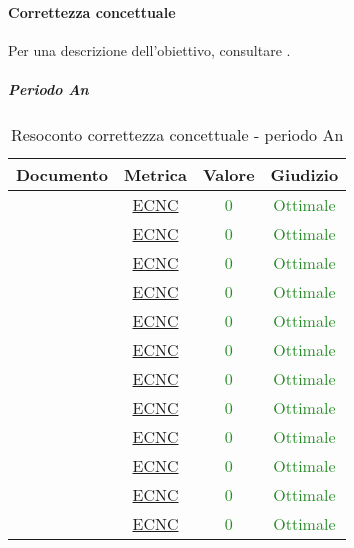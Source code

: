 				\paragraph{Correttezza concettuale}
					Per una descrizione dell'obiettivo, consultare .
					\subparagraph{Periodo An}
				
						\begin{table}[H]
							\centering
							\small
							\begin{tabular}{c | c | c | c}
								\hline
								\textbf{Documento} & \textbf{Metrica} & \textbf{Valore} & \textbf{Giudizio} \\
								\hline
								\pdpvuno & \hyperref[MCC]{ECNC} & \textcolor{ForestGreen}{0} & \textcolor{ForestGreen}{Ottimale} \\
								\pdqvuno & \hyperref[MCC]{ECNC} & \textcolor{ForestGreen}{0} & \textcolor{ForestGreen}{Ottimale}\\
								\ndpvuno & \hyperref[MCC]{ECNC} &\textcolor{ForestGreen}{0} & \textcolor{ForestGreen}{Ottimale}\\
								\sdfv & \hyperref[MCC]{ECNC} & \textcolor{ForestGreen}{0} & \textcolor{ForestGreen}{Ottimale}\\
								\adrvuno & \hyperref[MCC]{ECNC} & \textcolor{ForestGreen}{0} & \textcolor{ForestGreen}{Ottimale}\\
								\glvuno  & \hyperref[MCC]{ECNC} & \textcolor{ForestGreen}{0} & \textcolor{ForestGreen}{Ottimale}\\
								\vunoi& \hyperref[MCC]{ECNC} & \textcolor{ForestGreen}{0} & \textcolor{ForestGreen}{Ottimale}\\
								\vduei& \hyperref[MCC]{ECNC} & \textcolor{ForestGreen}{0} & \textcolor{ForestGreen}{Ottimale}\\
								\vtrei & \hyperref[MCC]{ECNC} & \textcolor{ForestGreen}{0} & \textcolor{ForestGreen}{Ottimale}\\
								\vquattroi & \hyperref[MCC]{ECNC} & \textcolor{ForestGreen}{0} & \textcolor{ForestGreen}{Ottimale}\\
								\vunoe & \hyperref[MCC]{ECNC} & \textcolor{ForestGreen}{0} & \textcolor{ForestGreen}{Ottimale}\\
								\vduee & \hyperref[MCC]{ECNC} & \textcolor{ForestGreen}{0} & \textcolor{ForestGreen}{Ottimale}\\
								\hline
							\end{tabular}
							\caption{Resoconto correttezza concettuale - periodo An}
							\label{tab_resoconto_correttezza_concettuale_PA}
						\end{table}

